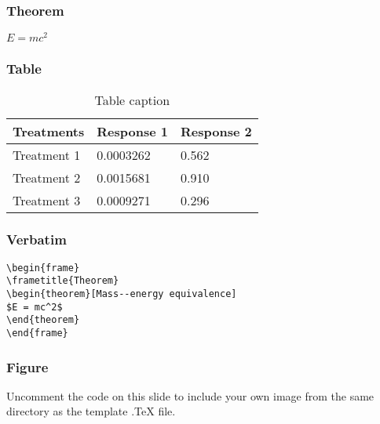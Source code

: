 \documentclass{beamer}
\begin{document}

\begin{frame}
\frametitle{Theorem}
\begin{theorem}
$E = mc^2$
\end{theorem}
\end{frame}


\begin{frame}
\frametitle{Table}
\begin{table}
\begin{tabular}{l l l}
\toprule
\textbf{Treatments} & \textbf{Response 1} & \textbf{Response 2}\\
\midrule
Treatment 1 & 0.0003262 & 0.562 \\
Treatment 2 & 0.0015681 & 0.910 \\
Treatment 3 & 0.0009271 & 0.296 \\
\bottomrule
\end{tabular}
\caption{Table caption}
\end{table}
\end{frame}


\begin{frame}[fragile] %
\frametitle{Verbatim}
\begin{example}
\begin{verbatim}
\begin{frame}
\frametitle{Theorem}
\begin{theorem}[Mass--energy equivalence]
$E = mc^2$
\end{theorem}
\end{frame}\end{verbatim}
\end{example}
\end{frame}


\begin{frame}
\frametitle{Figure}
Uncomment the code on this slide to include your own image from the same directory as the template .TeX file.
\end{frame}
\end{document}
